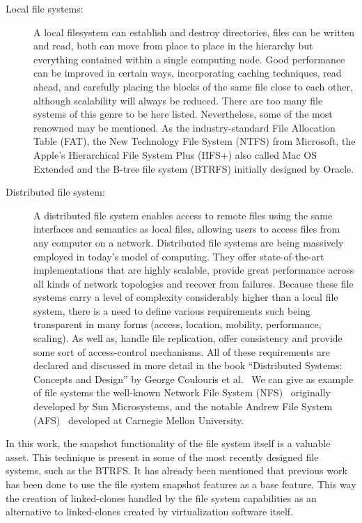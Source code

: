 \begin{description}
	\item [Local file systems:] A local filesystem can establish and destroy directories, files can be written and read, both can move from place to place in the hierarchy but everything contained within a single computing node. 
Good performance can be improved in certain ways, incorporating caching techniques, read ahead, and carefully placing the blocks of the same file close to each other, although scalability will always be reduced. 
There are too many file systems of this genre to be here listed. Nevertheless, some of the most renowned may be mentioned. As the industry-standard File Allocation Table (FAT), the New Technology File System (NTFS) from Microsoft, the Apple's Hierarchical File System Plus (HFS+) also called Mac OS Extended and the B-tree file system (BTRFS) initially designed by Oracle.
	\item [Distributed file system:] A distributed file system enables access to remote files using the same interfaces and semantics as local files, allowing users to access files from any computer on a network. 
	Distributed file systems are being massively employed in today's model of computing. They offer state-of-the-art implementations that are highly scalable, provide great performance across all kinds of network topologies and recover from failures. 
	Because these file systems carry a level of complexity considerably higher than a local file system, there is a need to define various requirements such being transparent in many forms (access, location, mobility, performance, scaling). As well as, handle file replication, offer consistency and provide some sort of access-control mechanisms. 
	All of these requirements are declared and discussed in more detail in the book \enquote{Distributed Systems: Concepts and Design} by George Coulouris et al.~\cite{Coulouris2011}
	We can give as example of file systems the well-known Network File System (NFS)~\cite{rfc5661} originally developed by Sun Microsystems, and the notable Andrew File System (AFS)~\cite{Satyanarayanan1990} developed at Carnegie Mellon University.
\end{description}


In this work, the snapshot functionality of the file system itself is a valuable asset. This technique is present in some of the most recently designed file systems, such as the BTRFS. It has already been mentioned that previous work has been done to use the file system snapshot features as a base feature. This way the creation of linked-clones handled by the file system capabilities as an alternative to linked-clones created by virtualization software itself.


